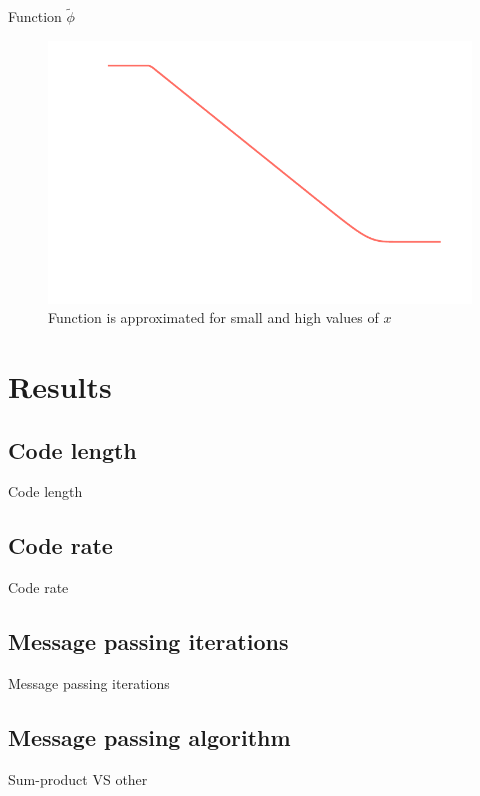 \documentclass{beamer}
\begin{document}
\begin{darkframes}
  \begin{frame}{Function $\tilde{\phi}$}
    \begin{figure}[h]
      \centering
      \includegraphics[width=\textwidth]{../plots/figures/phi_tilde.pdf}
      \vspace{-1cm}
      \caption{Function is approximated for small and high values of $x$}
      \label{fig:phi_tilde}
    \end{figure}
  \end{frame}

  \section{Results}
  \subsection{Code length}
  \begin{frame}{Code length}
  \end{frame}

  \subsection{Code rate}
  \begin{frame}{Code rate}
  \end{frame}

  \subsection{Message passing iterations}
  \begin{frame}{Message passing iterations}
  \end{frame}

  \subsection{Message passing algorithm}
  \begin{frame}{Sum-product VS other}
  \end{frame}

\end{darkframes}
\end{document}
